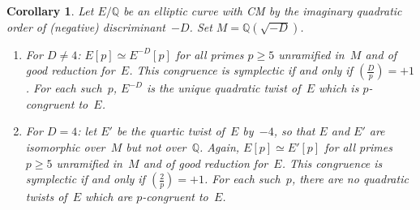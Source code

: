\documentclass[12pt, reqno]{amsart}
\newcommand{\Q}{\mathbb{Q}}
\def\legendre#1#2{\left(\displaystyle\frac{#1}{#2}\right)}
\numberwithin{equation}{section}
\newtheorem{corollary}[theorem]{Corollary}
\theoremstyle{definition}
\theoremstyle{remark}
\begin{document}
\begin{corollary}\label{C:CM-twist}
  Let $E/\Q$ be an elliptic curve with CM by the imaginary quadratic
  order of (negative) discriminant~$-D$.  Set $M=\Q(\sqrt{-D})$.

  \begin{enumerate}
  \item
    For $D\not=4$: $E[p] \simeq E^{-D}[p]$ for all primes $p \geq 5$
    unramified in~$M$ and of good reduction for~$E$.  This congruence
    is symplectic if and only if $\legendre{D}{p}=+1$.  For each
    such~$p$, $E^{-D}$ is the unique quadratic twist of~$E$
    which is $p$-congruent to~$E$.

  \item
    For $D=4$: let $E'$ be the quartic twist of~$E$ by~$-4$, so that
    $E$ and $E'$ are isomorphic over~$M$ but not over~$\Q$.  Again,
    $E[p] \simeq E'[p]$ for all primes $p \geq 5$ unramified in~$M$
    and of good reduction for~$E$.  This congruence is symplectic if
    and only if $\legendre{2}{p}=+1$.  For each such~$p$, there are no
    quadratic twists of~$E$ which are $p$-congruent to~$E$.
  \end{enumerate}
\end{corollary}
\end{document}
